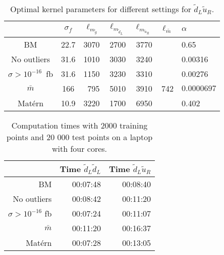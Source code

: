 \documentclass[twoside,english]{uiofysmaster}
\begin{document}
{%

\begin{table}
\centering
\begin{tabular}{@{}ccrrrrl@{}} \toprule
 & $\sigma_f$ & $\ell_{m_{\widetilde{g}}}$ & $\ell_{m_{\widetilde{d}_L}}$ & $\ell_{m_{\widetilde{u}_R}}$ & $\ell_{\bar{m}}$ &$\alpha$\\ \midrule
BM & 22.7 & 3070 & 2700 & 3770 && 0.65 \\
No outliers &  31.6& 1010 & 3030 & 3240&& 0.00316\\ 
$\sigma > 10^{-16}$~fb & 31.6 &1150  & 3230& 3310&& 0.00276 \\
$\bar{m}$ & 166 & 795&5010 &3910 & 742 & $0.0000697$\\
Mat\'{e}rn & 10.9 & 3220  &1700 & 6950 && 0.402\\ \bottomrule
\end{tabular}
\caption{Optimal kernel parameters for different settings for $\widetilde{d}_L \widetilde{u}_R$.}
\label{Tab:: evaluating cross : optimal kernels dLuR}
\end{table}
 
 
 
\begin{table}
\centering
\begin{tabular}{@{}rrr@{}} \toprule
& Time $\widetilde{d}_L \widetilde{d}_L$ & Time $\widetilde{d}_L \widetilde{u}_R$\\
\midrule
BM & 00:07:48 & 00:08:40\\
No outliers & 00:08:42 & 00:11:20\\
$\sigma > 10^{-16}$ fb & 00:07:24 & 00:11:07\\
$\bar{m}$ & 00:11:20 & 00:16:37\\
Mat\'{e}rn & 00:07:28 & 00:13:05\\ \bottomrule
\end{tabular}
\caption{Computation times with 2000 training points and 20 000 test points on a laptop with four cores.}
\label{Tab:: evaluating cross : computation times BM}
\end{table}


}
\end{document}
